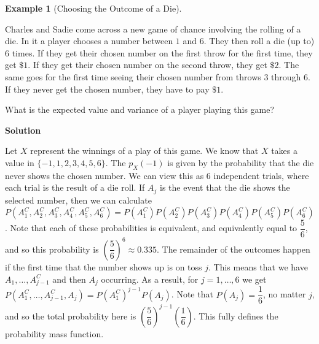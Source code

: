 \documentclass[
  letterpaper,
  DIV=11,
  numbers=noendperiod]{scrreprt}
\theoremstyle{definition}
\theoremstyle{definition}
\newtheorem{example}{Example}[chapter]
\theoremstyle{definition}
\theoremstyle{remark}
\begin{document}
\begin{example}[Choosing the Outcome of a
Die]\protect\hypertarget{exm-var-calc}{}\label{exm-var-calc}

Charles and Sadie come across a new game of chance involving the rolling
of a die. In it a player chooses a number between \(1\) and \(6\). They
then roll a die (up to) \(6\) times. If they get their chosen number on
the first throw for the first time, they get \(\$1\). If they get their
chosen number on the second throw, they get \(\$2\). The same goes for
the first time seeing their chosen number from throws \(3\) through
\(6\). If they never get the chosen number, they have to pay \(\$1\).

What is the expected value and variance of a player playing this game?

\begin{tcolorbox}[enhanced jigsaw, colback=white, colframe=quarto-callout-color-frame, arc=.35mm, leftrule=.75mm, rightrule=.15mm, opacityback=0, breakable, bottomrule=.15mm, left=2mm, toprule=.15mm]

\vspace{-3mm}\textbf{Solution}\vspace{3mm}

Let \(X\) represent the winnings of a play of this game. We know that
\(X\) takes a value in \(\{-1, 1, 2, 3, 4, 5, 6\}\). The \(p_X(-1)\) is
given by the probability that the die never shows the chosen number. We
can view this as \(6\) independent trials, where each trial is the
result of a die roll. If \(A_j\) is the event that the die shows the
selected number, then we can calculate
\(P(A_1^C, A_2^C, A_3^C, A_4^C, A_5^C, A_6^C) = P(A_1^C)P(A_2^C)P(A_3^C)P(A_4^C)P(A_5^C)P(A_6^C)\).
Note that each of these probabilities is equivalent, and equivalently
equal to \(\dfrac{5}{6}\), and so this probability is
\(\left(\dfrac{5}{6}\right)^6 \approx 0.335\). The remainder of the
outcomes happen if the first time that the number shows up is on toss
\(j\). This means that we have \(A_1, \dots, A_{j-1}^C\) and then
\(A_j\) occurring. As a result, for \(j=1,\dots,6\) we get
\(P(A_1^C, \dots, A_{j-1}^C, A_j) = P(A_1^C)^{j-1}P(A_j)\). Note that
\(P(A_j) = \dfrac{1}{6}\), no matter \(j\), and so the total probability
here is \(\left(\dfrac{5}{6}\right)^{j-1}\left(\dfrac{1}{6}\right)\).
This fully defines the probability mass function.


\end{tcolorbox}
\end{example}
\end{document}
